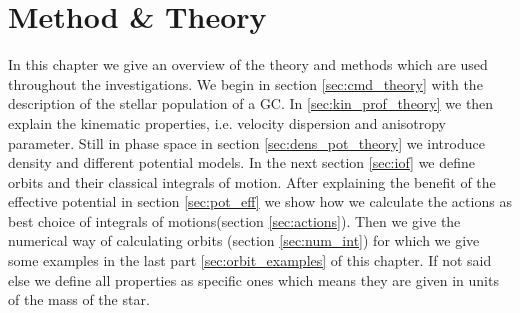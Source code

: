 \section{Method \& Theory}\label{sec:method_theory}
In this chapter we give an overview of the theory and methods which are used throughout the investigations. We begin in section \ref{sec:cmd_theory} with the description of the stellar population of a \ac{GC}. In \ref{sec:kin_prof_theory} we then explain the kinematic properties, i.e. velocity dispersion and anisotropy parameter. Still in phase space in section \ref{sec:dens_pot_theory} we introduce density and different potential models. In the next section \ref{sec:iof} we define orbits and their classical integrals of motion. After explaining the benefit of the effective potential in section \ref{sec:pot_eff} we show how we calculate the actions as best choice of integrals of motions(section \ref{sec:actions}). Then we give the numerical way of calculating orbits (section \ref{sec:num_int}) for which we give some examples in the last part \ref{sec:orbit_examples} of this chapter. If not said else we define all properties as specific ones which means they are given in units of the mass of the star.
